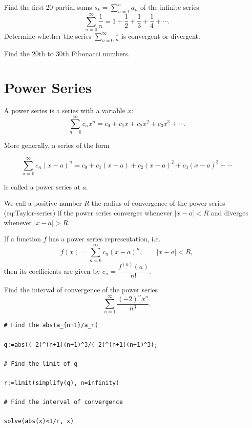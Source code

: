 \documentclass[]{book}
\theoremstyle{definition}
\theoremstyle{definition}
\theoremstyle{definition}
\theoremstyle{remark}
\let\BeginKnitrBlock\begin \let\EndKnitrBlock\end
\begin{document}
\BeginKnitrBlock{exercise}
\protect\hypertarget{exr:unnamed-chunk-8}{}{\label{exr:unnamed-chunk-8} }
Find the first 20 partial sums \(s_k=\sum_{n=1}^{n}a_n\) of the infinite series
\[\sum_{n=0}^\infty\frac1n=1+\frac12+\frac13+\frac14+\cdots.
\]
Determine whether the series \(\sum_{n=0}^\infty\frac1n\) is convergent or divergent.
\EndKnitrBlock{exercise}

\BeginKnitrBlock{exercise}
\protect\hypertarget{exr:unnamed-chunk-9}{}{\label{exr:unnamed-chunk-9} }
Find the 20th to 30th Fibonacci numbers.
\EndKnitrBlock{exercise}

\hypertarget{power-series}{%
\chapter{Power Series}\label{power-series}}

A power series is a series with a variable \(x\):
\[
\sum\limits_{n=0}^{\infty} c_nx^n=c_0+c_1x+c_2x^2+c_3x^3+\cdots.
\]

More generally, a series of the form

\begin{equation}
\sum\limits_{n=0}^{\infty} c_n(x-a)^n=c_0+c_1(x-a)+c_2(x-a)^2+c_3(x-a)^3+\cdots
\label{eq:Taylor-series}
\end{equation}

is called a power series at \(a\).

We call a positive number \(R\) the radius of convergence of the power series (eq:Taylor-series) if the power series converges whenever \(\left|x-a\right|<R\) and diverges whenever \(\left|x-a\right|>R\).

If a function \(f\) has a power series representation, i.e.
\[
f(x)=\sum_{n=0}^\infty c_n(x-a)^n,\quad\quad \left|x-a\right|<R,
\]
then its coefficients are given by \(c_n=\dfrac{f^{(n)}(a)}{n!}.\)

\BeginKnitrBlock{example}
\protect\hypertarget{exm:unnamed-chunk-1}{}{\label{exm:unnamed-chunk-1} }
Find the interval of convergence of the power series
\[
\sum\limits_{n=1}^{\infty}\dfrac{(-2)^nx^n}{n^3}.
\]
\EndKnitrBlock{example}

\BeginKnitrBlock{solution}
{}

\begin{verbatim}
# Find the abs(a_{n+1}/a_n)

q:=abs((-2)^(n+1)(n+1)^3/(-2)^(n+1)(n+1)^3);

# Find the limit of q

r:=limit(simplify(q), n=infinity)

# Find the interval of convergence

solve(abs(x)<1/r, x)
\end{verbatim}
\EndKnitrBlock{solution}
\end{document}
